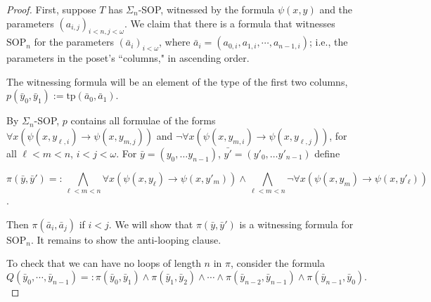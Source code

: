 \documentclass[10pt,a4paper]{amsart}
\newcommand{\tp}{\text{tp}}
\newcommand{\SOP}{\text{SOP}}
\newcommand{\vphi}{\varphi}
\begin{document}
\begin{proof}
    First, suppose $T$ has $\Sigma_n$-SOP, witnessed by the formula $\psi(x,y)$ and the parameters $(a_{i,j})_{i<n, j<\omega}$. %
    We claim that there is a formula that witnesses $\SOP_n$ for the parameters $(\bar{a}_i)_{i<\omega}$, where $\bar{a}_i=(a_{0,i}, a_{1,i},\dotsm, a_{n-1,i})$; i.e., the parameters in the poset's ``columns," in ascending order. 
    

    The witnessing formula will be an element of the type of the first two columns, $p(\bar{y}_0, \bar{y}_1):=\tp(\bar{a}_0, \bar{a}_1)$.

    By $\Sigma_n$-SOP, $p$ contains all formulae of the forms $\forall x(\psi(x, y_{\ell,i})\to \psi(x, y_{m,j}))$ and $\neg \forall x(\psi(x, y_{m,i})\to \psi(x, y_{\ell, j}))$, for all $\ell<m<n$, $i < j < \omega$. For $\bar{y}=(y_{0}, \ldots y_{n-1})$, $\bar{y'}=(y'_{0}, \ldots y'_{n-1})$ define 
    
    $$\pi(\bar{y}, \bar{y}')=: \bigwedge_{\ell < m < n} \forall x(\psi(x, y_{\ell})\to \psi(x, y'_{m})) \wedge \bigwedge_{\ell < m < n} \neg \forall x(\psi(x, y_{m})\to \psi(x, y'_{\ell})) $$.

    Then $\pi(\bar{a}_{i}, \bar{a}_{j})$ if $i < j$. We will show that $\pi(\bar{y}, \bar{y}')$ is a witnessing formula for $\mathrm{SOP}_{n}$. It remains to show the anti-looping clause.

    To check that we can have no loops of length $n$ in $\pi$, consider the formula %
    \[Q(\bar{y}_0,\dotsm, \bar{y}_{n-1})=: \pi(\bar{y}_0,\bar{y}_1)\wedge \pi(\bar{y}_1,\bar{y}_2)\wedge\dotsm \wedge \pi(\bar{y}_{n-2},\bar{y}_{n-1})\wedge \pi(\bar{y}_{n-1},\bar{y}_0).\] %


\end{proof}
\end{document}
